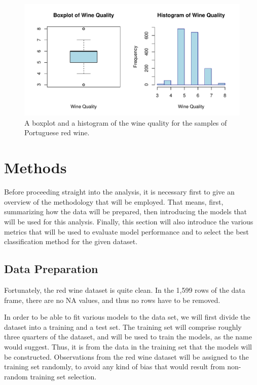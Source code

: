 \documentclass[12pt]{article}
\begin{document}
\begin{figure}[tbp]
 \centering
 \includegraphics[width=\textwidth]{manuscriptfigure.pdf}
 \caption{A boxplot and a histogram of the wine quality for the samples of Portuguese red wine.}
 \label{fig:wine}
\end{figure}

\section{Methods}
\label{sec:meth}

Before proceeding straight into the analysis, it is necessary first to give an overview 
of the methodology that will be employed.  That means, first, summarizing how the data 
will be prepared, then introducing the models that will be used for this analysis.  
Finally, this section will also introduce the various metrics that will be used to evaluate 
model performance and to select the best classification method for the given dataset.  

\subsection{Data Preparation}
\label{sec:prep}

Fortunately, the red wine dataset is quite clean.  In the 1,599 rows of the data frame, there 
are no NA values, and thus no rows have to be removed.  

In order to be able to fit various models to the data set, we will first divide the dataset 
into a training and a test set.  The training set will comprise roughly three quarters of the 
dataset, and will be used to train the models, as the name would suggest.  Thus, it is from 
the data in the training set that the models will be constructed.  Observations from the red 
wine dataset will be assigned to the training set randomly, to avoid any kind of bias that 
would result from non-random training set selection.  
\end{document}
